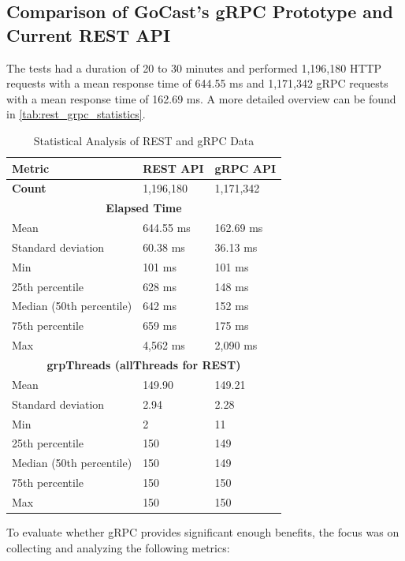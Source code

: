 \subsection{Comparison of GoCast's gRPC Prototype and Current REST API}
The tests had a duration of 20 to 30 minutes and performed 1,196,180 HTTP requests with a mean response time of 644.55 ms and 1,171,342 gRPC requests with a mean response time of 162.69 ms. A more detailed overview can be found in \autoref{tab:rest_grpc_statistics}.

\begin{table}[htbp]
\centering
\caption{Statistical Analysis of REST and gRPC Data}
\label{tab:rest_grpc_statistics}
\begin{tabular}{|l|l|l|}
\hline
\textbf{Metric} & \textbf{REST API} & \textbf{gRPC API} \\ \hline
\textbf{Count} & 1,196,180 & 1,171,342 \\ \hline
\multicolumn{3}{|c|}{\textbf{Elapsed Time}} \\ \hline
Mean & 644.55 ms & 162.69 ms \\ \hline
Standard deviation & 60.38 ms & 36.13 ms \\ \hline
Min & 101 ms & 101 ms \\ \hline
25th percentile & 628 ms & 148 ms \\ \hline
Median (50th percentile) & 642 ms & 152 ms \\ \hline
75th percentile & 659 ms & 175 ms \\ \hline
Max & 4,562 ms & 2,090 ms \\ \hline
\multicolumn{3}{|c|}{\textbf{grpThreads (allThreads for REST)}} \\ \hline
Mean & 149.90 & 149.21 \\ \hline
Standard deviation & 2.94 & 2.28 \\ \hline
Min & 2 & 11 \\ \hline
25th percentile & 150 & 149 \\ \hline
Median (50th percentile) & 150 & 149 \\ \hline
75th percentile & 150 & 150 \\ \hline
Max & 150 & 150 \\ \hline
\end{tabular}
\end{table}

To evaluate whether gRPC provides significant enough benefits, the focus was on collecting and analyzing the following metrics:

